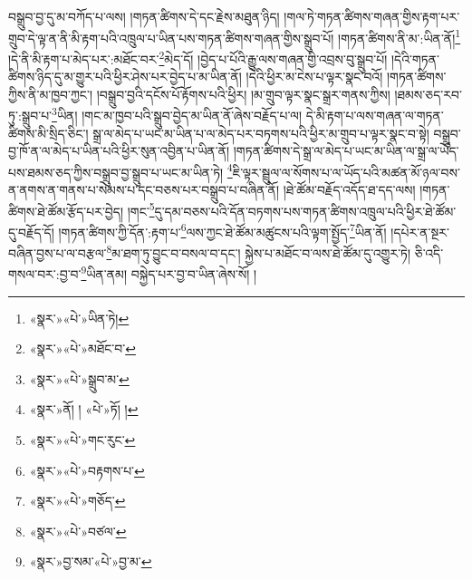 བསྒྲུབ་བྱ་དུ་མ་བཀོད་པ་ལས། །གཏན་ཚིགས་དེ་དང་རྗེས་མཐུན་ཉིད། །གལ་ཏེ་གཏན་ཚིགས་གཞན་གྱིས་རྟག་པར་གྲུབ་དེ་ལྟ་ན་ནི་མི་རྟག་པའི་འཁྲུལ་པ་ཡིན་པས་གཏན་ཚིགས་གཞན་གྱིས་སྒྲུབ་པོ། །གཏན་ཚིགས་ནི་མ་:ཡིན་ནོ།\footnote{«སྣར་»«པེ་»ཡིན་ཏེ།} །དེ་ནི་མི་རྟག་པ་མེད་པར་:མཐོང་བར་\footnote{«སྣར་»«པེ་»མཐོང་བ་}མེད་དོ། །བྱེད་པ་པོའི་རྒྱུ་ལས་གཞན་གྱི་འབྲས་བུ་སྒྲུབ་པོ། །དེའི་གཏན་ཚིགས་ཉིད་དུ་མ་གྱུར་པའི་ཕྱིར་ཤེས་པར་བྱེད་པ་མ་ཡིན་ནོ། །དེའི་ཕྱིར་མ་ངེས་པ་ལྟར་སྣང་བའོ། །གཏན་ཚིགས་ཀྱིས་ནི་མ་ཁྱབ་ཀྱང་། །བསྒྲུབ་བྱའི་དངོས་པོ་རྟོགས་པའི་ཕྱིར། །མ་གྲུབ་ལྟར་སྣང་སྒྲར་གནས་ཀྱིས། །ཐམས་ཅད་རབ་ཏུ་:སྒྲུབ་པ་\footnote{«སྣར་»«པེ་»སྒྲུབ་མ་}ཡིན། །གང་མ་ཁྱབ་པའི་སྒྲུབ་བྱེད་མ་ཡིན་ནོ་ཞེས་བརྗོད་པ་ལ། དེ་མི་རྟག་པ་ལས་གཞན་ལ་གཏན་ཚིགས་མི་སྲིད་ཅིང་། སྒྲ་ལ་མེད་པ་ཡང་མ་ཡིན་པ་ལ་མེད་པར་བཏགས་པའི་ཕྱིར་མ་གྲུབ་པ་ལྟར་སྣང་བ་སྟེ། བསྒྲུབ་བྱ་ཁོ་ན་ལ་མེད་པ་ཡིན་པའི་ཕྱིར་སུན་འབྱིན་པ་ཡིན་ནོ། །གཏན་ཚིགས་དེ་སྒྲ་ལ་མེད་པ་ཡང་མ་ཡིན་ལ་སྒྲ་ལ་ཡོད་པས་ཐམས་ཅད་ཀྱིས་བསྒྲུབ་བྱ་སྒྲུབ་པ་ཡང་མ་ཡིན་ཏེ། \footnote{«སྣར་»ནོ། ། «པེ་»ཏོ། ། }ཇི་ལྟར་སྦྲུལ་ལ་སོགས་པ་ལ་ཡོད་པའི་མཚན་མོ་ཉལ་བས་ན་ནགས་ན་གནས་པ་སེམས་པ་དང་བཅས་པར་བསྒྲུབ་པ་བཞིན་ནོ། །ཐེ་ཚོམ་བརྗོད་འདོད་ཐ་དད་ལས། །གཏན་ཚིགས་ཐེ་ཚོམ་རྩོད་པར་བྱེད། །གང་\footnote{«སྣར་»«པེ་»གང་རུང་}དུ་དམ་བཅས་པའི་དོན་བཏགས་པས་གཏན་ཚིགས་འཁྲུལ་པའི་ཕྱིར་ཐེ་ཚོམ་དུ་བརྗོད་དོ། །གཏན་ཚིགས་ཀྱི་དོན་:རྟག་པ་\footnote{«སྣར་»«པེ་»བརྟགས་པ་}ལས་ཀྱང་ཐེ་ཚོམ་མཚུངས་པའི་ལྟག་སྤྱོད་\footnote{«སྣར་»«པེ་»གཅོད་}ཡིན་ནོ། །དཔེར་ན་སྔར་བཞིན་བྱས་པ་ལ་བརྩལ་\footnote{«སྣར་»«པེ་»བཙལ་}མ་ཐག་ཏུ་བྱུང་བ་བསལ་བ་དང་། སྐྱེས་པ་མཐོང་བ་ལས་ཐེ་ཚོམ་དུ་འགྱུར་ཏེ། ཅི་འདི་གསལ་བར་:བྱ་བ་\footnote{«སྣར་»བྱ་སམ་«པེ་»བྱ་མ་}ཡིན་ནམ། བསྐྱེད་པར་བྱ་བ་ཡིན་ཞེས་སོ། །
